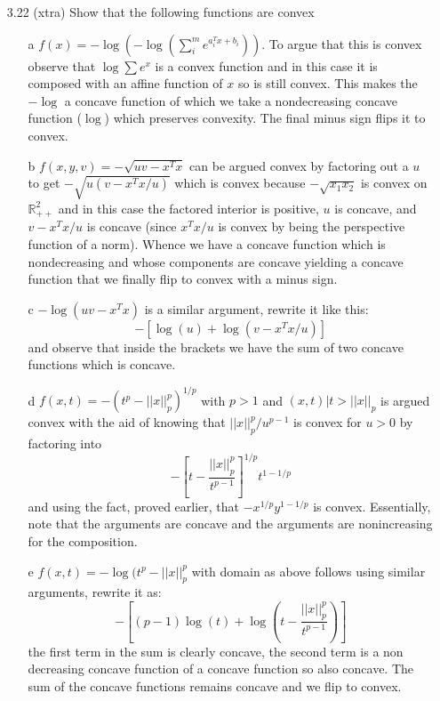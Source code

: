 \documentclass[12pt]{article}
\begin{document}
\begin{itemize}
\item[3.22 (xtra)] Show that the following functions are convex
  \begin{itemize}
  \item[a] $f(x) = -\log (-\log ( \sum_i^m e^{a_i^T x + b_i}))$. To argue that this is convex observe that $\log \sum e^x$ is a convex function and in this case it is composed with an affine function of $x$ so is still convex. This makes the $-\log$ a concave function of which we take a nondecreasing concave function ($\log$) which preserves convexity. The final minus sign flips it to convex.
  \item[b] $f(x, y, v) = - \sqrt{uv - x^Tx}$ can be argued convex by factoring out a $u$ to get $-\sqrt{u(v - x^Tx/u)}$ which is convex because $-\sqrt{x_1x_2}$ is convex on $\mathbb{R}_{++}^2$ and in this case the factored interior is positive, $u$ is concave, and $v - x^Tx/u$ is concave (since $x^Tx/u$ is convex by being the perspective function of a norm). Whence we have a concave function which is nondecreasing and whose components are concave yielding a concave function that we finally flip to convex with a minus sign.
  \item[c] $-\log(uv - x^Tx)$ is a similar argument, rewrite it like this:
    $$- \left[ \log(u) + \log ( v - x^Tx/u) \right]$$
    and observe that inside the brackets we have the sum of two concave functions which is concave.    
  \item[d] $f(x,t) = -(t^p - ||x||_p^p)^{1/p}$ with $p > 1$ and ${(x,t) | t > ||x||_p}$ is argued convex with the aid of knowing that $||x||_p^p / u^{p-1}$ is convex for $u > 0$ by factoring into
    $$-\left[ t - \frac{||x||_p^p}{t^{p-1}}\right]^{1/p}t^{1-1/p}$$
    and using the fact, proved earlier, that $-x^{1/p}y^{1-1/p}$ is convex. Essentially, note that the arguments are concave and the arguments are nonincreasing for the composition.
  \item[e] $f(x,t) = -\log ( t^p - ||x||_p^p$ with domain as above follows using similar arguments, rewrite it as:
    $$-\left[(p-1)\log(t) + \log \left( t - \frac{||x||_p^p}{t^{p-1}}\right)\right]$$
    the first term in the sum is clearly concave, the second term is a non decreasing concave function of a concave function so also concave. The sum of the concave functions remains concave and we flip to convex.
  \end{itemize}


\end{itemize}
\end{document}
